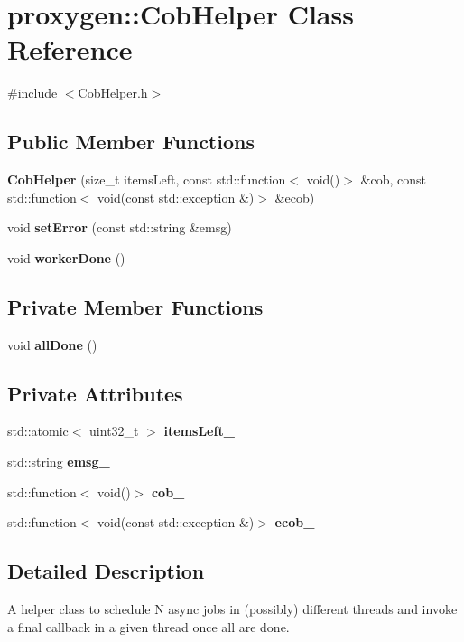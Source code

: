 \section{proxygen\+:\+:Cob\+Helper Class Reference}
\label{classproxygen_1_1CobHelper}


{\ttfamily \#include $<$Cob\+Helper.\+h$>$}

\subsection*{Public Member Functions}
\begin{DoxyCompactItemize}
\item 
{\bf Cob\+Helper} (size\+\_\+t items\+Left, const std\+::function$<$ void()$>$ \&cob, const std\+::function$<$ void(const std\+::exception \&)$>$ \&ecob)
\item 
void {\bf set\+Error} (const std\+::string \&emsg)
\item 
void {\bf worker\+Done} ()
\end{DoxyCompactItemize}
\subsection*{Private Member Functions}
\begin{DoxyCompactItemize}
\item 
void {\bf all\+Done} ()
\end{DoxyCompactItemize}
\subsection*{Private Attributes}
\begin{DoxyCompactItemize}
\item 
std\+::atomic$<$ uint32\+\_\+t $>$ {\bf items\+Left\+\_\+}
\item 
std\+::string {\bf emsg\+\_\+}
\item 
std\+::function$<$ void()$>$ {\bf cob\+\_\+}
\item 
std\+::function$<$ void(const std\+::exception \&)$>$ {\bf ecob\+\_\+}
\end{DoxyCompactItemize}


\subsection{Detailed Description}
A helper class to schedule N async jobs in (possibly) different threads and invoke a final callback in a given thread once all are done. 

